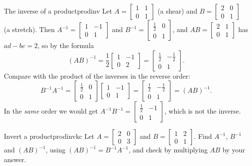 \documentclass[11pt]{article}
\begin{document}
\begin{exmp}{The inverse of a product}{prodinv}
Let $A=\begin{bmatrix}1&1\\0&1\end{bmatrix}$ (a shear) and $B=\begin{bmatrix}2&0\\0&1\end{bmatrix}$ (a stretch). Then $A^{-1}=\begin{bmatrix}1&-1\\0&1\end{bmatrix}$ and $B^{-1}=\begin{bmatrix}\tfrac12&0\\0&1\end{bmatrix}$, and $AB=\begin{bmatrix}2&1\\0&1\end{bmatrix}$ has $ad-bc=2$, so by the formula
\[
(AB)^{-1}=\frac12\begin{bmatrix}1&-1\\0&2\end{bmatrix}=\begin{bmatrix}\tfrac12&-\tfrac12\\0&1\end{bmatrix}.
\]
Compare with the product of the inverses in the reverse order:
\[
B^{-1}A^{-1}=\begin{bmatrix}\tfrac12&0\\0&1\end{bmatrix}\begin{bmatrix}1&-1\\0&1\end{bmatrix}=\begin{bmatrix}\tfrac12&-\tfrac12\\0&1\end{bmatrix}=(AB)^{-1}.
\]
In the \emph{same} order we would get $A^{-1}B^{-1}=\begin{bmatrix}\tfrac12&-1\\0&1\end{bmatrix}$, which is not the inverse.
\end{exmp}

\begin{kc}{Invert a product}{prodinvkc}
Let $A=\begin{bmatrix}2&0\\0&3\end{bmatrix}$ and $B=\begin{bmatrix}1&2\\0&1\end{bmatrix}$. Find $A^{-1}$, $B^{-1}$ and $(AB)^{-1}$, using $(AB)^{-1}=B^{-1}A^{-1}$, and check by multiplying $AB$ by your answer.
\end{kc}
\end{document}

